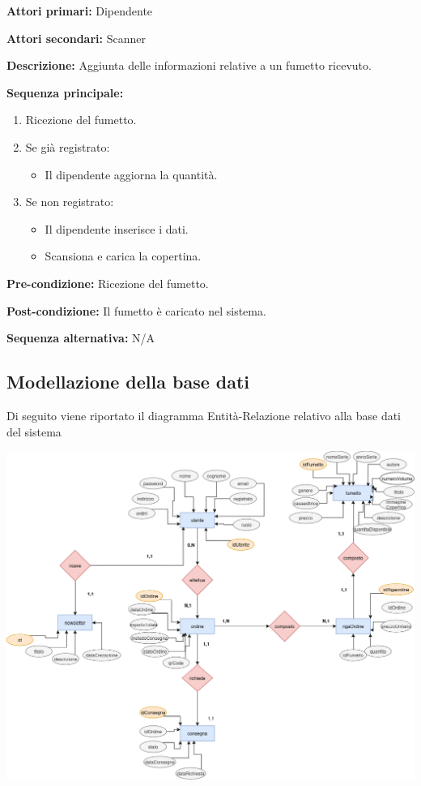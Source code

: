 \documentclass[12pt, a4paper]{article}
\begin{document}
\begin{tcolorbox}[
  title=Scenario: Aggiunta Fumetto,
  coltitle=black,
  colbacktitle=cyan!10,
  colback=white,
  colframe=gray!60!black,
  fonttitle=\bfseries,
  sharp corners=south
]
\textbf{Attori primari:} Dipendente

\textbf{Attori secondari:} Scanner

\textbf{Descrizione:} Aggiunta delle informazioni relative a un fumetto ricevuto.

\vspace{0.5em}
\textbf{Sequenza principale:}
\begin{enumerate}
  \item Ricezione del fumetto.
  \item Se già registrato:
  \begin{itemize}
    \item Il dipendente aggiorna la quantità.
  \end{itemize}
  \item Se non registrato:
  \begin{itemize}
    \item Il dipendente inserisce i dati.
    \item Scansiona e carica la copertina.
  \end{itemize}
\end{enumerate}

\textbf{Pre-condizione:} Ricezione del fumetto.

\textbf{Post-condizione:} Il fumetto è caricato nel sistema.

\textbf{Sequenza alternativa:} N/A
\end{tcolorbox}
\subsection{Modellazione della base dati}
Di seguito viene riportato il diagramma Entità-Relazione relativo alla base dati del sistema
\begin{center}
  \includegraphics[scale=0.42]{./public/erdiagram.png}
\end{center}
\newpage
\end{document}

